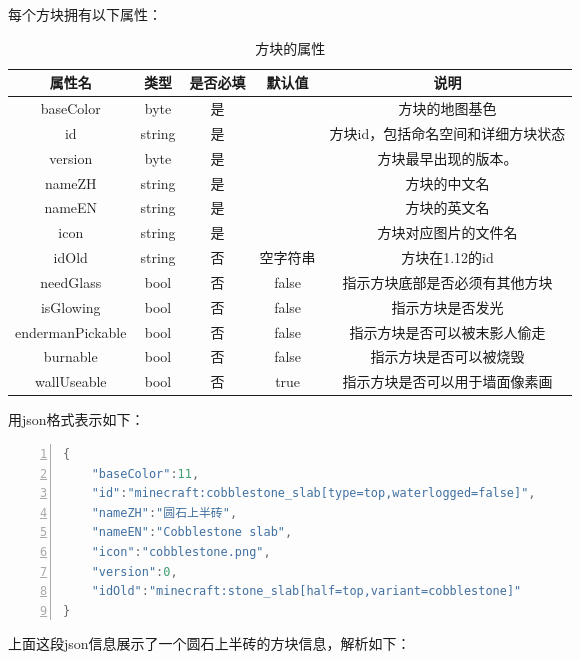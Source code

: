 \documentclass[UTF8]{ctexart}
\begin{document}
   每个方块拥有以下属性：
   \begin{table}[h]
    \centering
    \caption{方块的属性}
    \begin{tabular}{ccccc}
        \hline
        属性名 & 类型 & 是否必填 & 默认值 & 说明  \\ \hline
        baseColor & byte & 是 & & 方块的地图基色 \\
        id & string & 是 & & 方块id，包括命名空间和详细方块状态\\
        version & byte & 是 & & 方块最早出现的版本。 \\
        nameZH & string & 是 & & 方块的中文名 \\
        nameEN & string & 是 & & 方块的英文名 \\
        icon & string & 是 & & 方块对应图片的文件名 \\
        idOld & string & 否 & 空字符串 & 方块在1.12的id \\
        needGlass & bool & 否 & false & 指示方块底部是否必须有其他方块 \\
        isGlowing & bool & 否 & false & 指示方块是否发光 \\
        endermanPickable & bool & 否 & false & 指示方块是否可以被末影人偷走 \\
        burnable & bool & 否 & false & 指示方块是否可以被烧毁 \\
        wallUseable & bool & 否 & true & 指示方块是否可以用于墙面像素画 \\
        \hline 
    \end{tabular}       
   \end{table}
   
   \clearpage
   用json格式表示如下：
\begin{lstlisting}[language = C++, numbers=left, 
    numberstyle=\tiny,keywordstyle=\color{blue!70},
    commentstyle=\color{red!50!green!50!blue!50},frame=shadowbox,
    rulesepcolor=\color{red!20!green!20!blue!20},basicstyle=\ttfamily]
{
    "baseColor":11,
    "id":"minecraft:cobblestone_slab[type=top,waterlogged=false]",
    "nameZH":"圆石上半砖",
    "nameEN":"Cobblestone slab",
    "icon":"cobblestone.png",
    "version":0,
    "idOld":"minecraft:stone_slab[half=top,variant=cobblestone]"
}
    \end{lstlisting}
    上面这段json信息展示了一个圆石上半砖的方块信息，解析如下：
\end{document}
